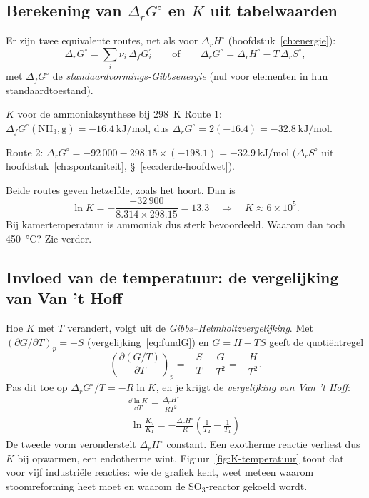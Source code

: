 \subsection{Berekening van $\Delta_rG^\circ$ en $K$ uit tabelwaarden}
\label{sec:drG-uit-tabellen}

Er zijn twee equivalente routes, net als voor $\Delta_rH^\circ$ (hoofdstuk~\ref{ch:energie}):
\begin{equation}
\Delta_r G^\circ = \sum_i \nu_i\,\Delta_fG_i^\circ
\qquad\text{of}\qquad
\Delta_rG^\circ = \Delta_rH^\circ - T\,\Delta_rS^\circ,
\end{equation}
met $\Delta_fG^\circ$ de \emph{standaardvormings-Gibbsenergie} (nul voor elementen in hun standaardtoestand).

\begin{voorbeeld}{$K$ voor de ammoniaksynthese bij \SI{298}{\kelvin}}
Route 1: $\Delta_fG^\circ(\mathrm{NH_3,g}) = \SI{-16.4}{\kilo\joule\per\mole}$, dus $\Delta_rG^\circ = 2(-16.4) = \SI{-32.8}{\kilo\joule\per\mole}$.

Route 2: $\Delta_rG^\circ = -92\,000 - 298.15 \times (-198.1) = \SI{-32.9}{\kilo\joule\per\mole}$ ($\Delta_rS^\circ$ uit hoofdstuk~\ref{ch:spontaniteit}, \S~\ref{sec:derde-hoofdwet}).

Beide routes geven hetzelfde, zoals het hoort. Dan is
\[
\ln K = -\frac{-32\,900}{8.314 \times 298.15} = 13.3 \quad\Rightarrow\quad K \approx 6\times10^{5}.
\]
Bij kamertemperatuur is ammoniak dus sterk bevoordeeld. Waarom dan toch \SI{450}{\celsius}? Zie verder.
\end{voorbeeld}

\subsection{Invloed van de temperatuur: de vergelijking van Van 't Hoff}
\label{sec:vanthoff}\label{sec:vanthoff-reagerend}

Hoe $K$ met $T$ verandert, volgt uit de \emph{Gibbs--Helmholtzvergelijking}. Met $(\partial G/\partial T)_p = -S$ (vergelijking~\eqref{eq:fundG}) en $G = H - TS$ geeft de quoti\"entregel
\begin{equation}
\left(\frac{\partial (G/T)}{\partial T}\right)_p = -\frac{S}{T} - \frac{G}{T^2} = -\frac{H}{T^2}.
\label{eq:gibbs-helmholtz}
\end{equation}
Pas dit toe op $\Delta_rG^\circ/T = -R\ln K$, en je krijgt de \emph{vergelijking van Van 't Hoff}:
\begin{gather}
\frac{\dd{\ln K}}{\dd T} = \frac{\Delta_r H^\circ}{RT^2}
\label{eq:vanthoff-diff}\\
\boxed{\;\ln\frac{K_2}{K_1} = -\frac{\Delta_rH^\circ}{R}\left(\frac{1}{T_2}-\frac{1}{T_1}\right)\;}
\label{eq:vanthoff-int}
\end{gather}
De tweede vorm veronderstelt $\Delta_rH^\circ$ constant. Een exotherme reactie verliest dus $K$ bij opwarmen, een endotherme wint. Figuur~\ref{fig:K-temperatuur} toont dat voor vijf industri\"ele reacties: wie de grafiek kent, weet meteen waarom stoomreforming heet moet en waarom de SO$_3$-reactor gekoeld wordt.

